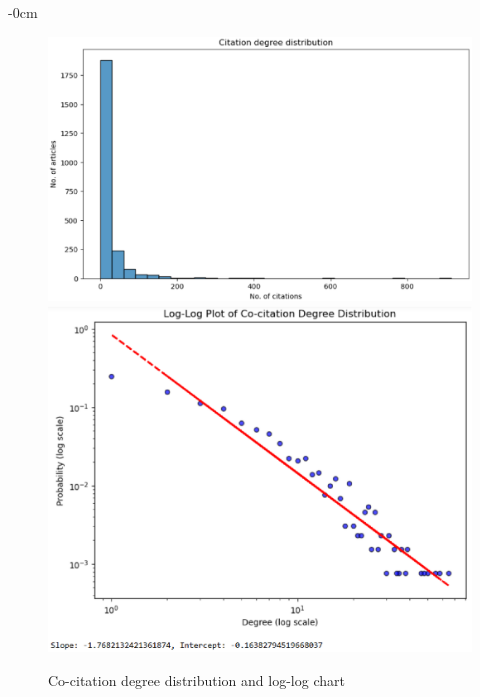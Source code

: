 \documentclass[jmse,review,submit,pdftex,moreauthors]{Definitions/mdpi}
\begin{document}
\begin{adjustwidth}{-\extralength}{0cm}
\begin{figure}[H]
	\centering
	\includegraphics[height=0.2\textheight, keepaspectratio]{pics/citation_degree_distribution.eps}
	\includegraphics[height=0.2\textheight, keepaspectratio]{pics/loglog_citation_degree_distribution.eps}
	\caption{Co-citation degree distribution and log-log chart} \label{fig:fig8}
\end{figure}


\end{adjustwidth}
\end{document}

